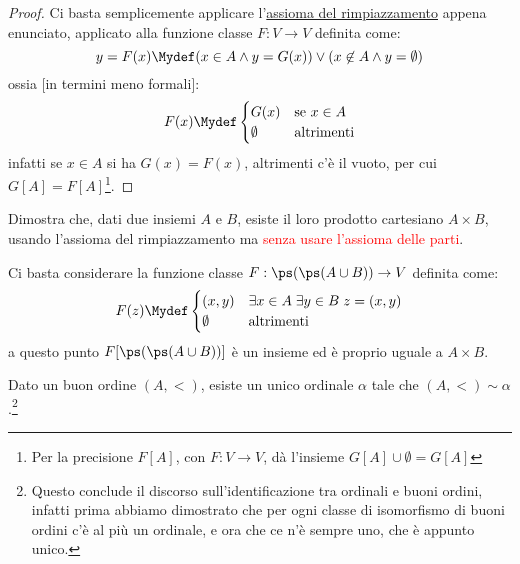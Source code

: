 \documentclass[11pt]{scrartcl}
\begin{document}
\begin{proof}
	Ci basta semplicemente applicare l'\hyperref[ax8]{assioma del rimpiazzamento} appena enunciato, applicato alla funzione classe $F : V \rightarrow V$ definita come:
	\[ y = F(x) \Mydef (x \in A \land y = G(x)) \lor (x \not \in A \land y = \emptyset)
		\]
	ossia [in termini meno formali]:
	\[ F(x) \Mydef \begin{cases}
		G(x) &\text{se $x \in A$} \\
		\emptyset &\text{altrimenti}
	\end{cases}
		\]
	infatti se $x \in A$ si ha $G(x) = F(x)$, altrimenti c'è il vuoto, per cui $G[A] = F[A]$\footnote{Per la precisione $F[A]$, con $F : V \rightarrow V$, dà l'insieme $G[A] \cup \emptyset = G[A]$}.
\end{proof}

\begin{exercise}
	Dimostra che, dati due insiemi $A$ e $B$, esiste il loro prodotto cartesiano $A \times B$, usando l'assioma del rimpiazzamento ma \textcolor{red}{senza usare l'assioma delle parti}.
\end{exercise}

\begin{soln}
	Ci basta considerare la funzione classe $F : \ps(\ps(A \cup B)) \rightarrow V$ definita come:
	\[ F(z) \Mydef \begin{cases}
		(x,y) &\exists x \in A \; \exists y \in B \; z = (x,y) \\
		\emptyset &\text{altrimenti}
	\end{cases}
		\]
	a questo punto $F[\ps(\ps(A \cup B))]$ è un insieme ed è proprio uguale a $A \times B$.
\end{soln}

\begin{theorem}
	Dato un buon ordine $(A,<)$, esiste un unico ordinale $\alpha$ tale che $(A,<)\sim\alpha$.\footnote{Questo conclude il discorso sull'identificazione tra ordinali e buoni ordini, infatti prima abbiamo dimostrato che per ogni classe 
	di isomorfismo di buoni ordini c'è al più un ordinale, e ora che ce n'è sempre uno, che è appunto unico.}
\end{theorem}
\end{document}

